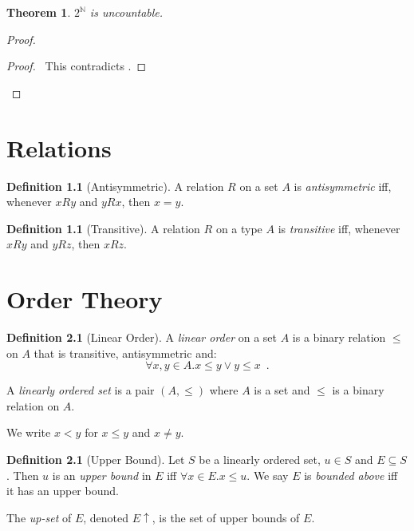 \documentclass{book}
\let\qed\relax
\newtheorem{thm}[prop]{Theorem}
\theoremstyle{definition}
\newtheorem{df}[prop]{Definition}
\begin{document}
\begin{thm}
$2^\mathbb{N}$ is uncountable.
\end{thm}

\begin{proof}
\pf
{}
\qedstep
\begin{proof}
	\pf\ This contradicts .
\end{proof}
\qed
\end{proof}

\chapter{Relations}

\begin{df}[Antisymmetric]
A relation $R$ on a set $A$ is \emph{antisymmetric} iff, whenever $xRy$ and $yRx$, then $x = y$.
\end{df}

\begin{df}[Transitive]
A relation $R$ on a type $A$ is \emph{transitive} iff, whenever $xRy$ and $yRz$, then $xRz$.
\end{df}

\chapter{Order Theory}

\begin{df}[Linear Order]
A \emph{linear order} on a set $A$ is a binary relation $\leq$ on $A$ that is transitive, antisymmetric and:
\[ \forall x,y \in A. x \leq y \vee y \leq x \enspace . \]

A \emph{linearly ordered set} is a pair $(A, \leq)$ where $A$ is a set and $\leq$ is a binary relation on $A$.

We write $x < y$ for $x \leq y$ and $x \neq y$.
\end{df}

\begin{df}[Upper Bound]
Let $S$ be a linearly ordered set, $u \in S$ and $E \subseteq S$. Then $u$ is an \emph{upper bound} in $E$ iff $\forall x \in E. x \leq u$. We say $E$ is \emph{bounded above} iff it has an upper bound.

The \emph{up-set} of $E$, denoted $E \uparrow$, is the set of upper bounds of $E$.
\end{df}
\end{document}

